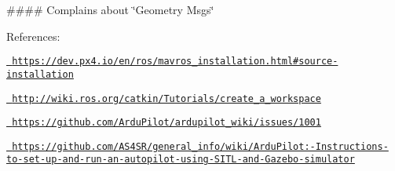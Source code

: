 \#\#\#\# Complains about \char`\"{}\+Geometry Msgs\char`\"{} 
\begin{DoxyCode}{0}
\end{DoxyCode}


\DoxyHorRuler


References\+:
\begin{DoxyItemize}
\item \href{https://dev.px4.io/en/ros/mavros_installation.html\#source-installation}{\texttt{ https\+://dev.\+px4.\+io/en/ros/mavros\+\_\+installation.\+html\#source-\/installation}}
\item \href{http://wiki.ros.org/catkin/Tutorials/create_a_workspace}{\texttt{ http\+://wiki.\+ros.\+org/catkin/\+Tutorials/create\+\_\+a\+\_\+workspace}}
\item \href{https://github.com/ArduPilot/ardupilot_wiki/issues/1001}{\texttt{ https\+://github.\+com/\+Ardu\+Pilot/ardupilot\+\_\+wiki/issues/1001}}
\item \href{https://github.com/AS4SR/general_info/wiki/ArduPilot:-Instructions-to-set-up-and-run-an-autopilot-using-SITL-and-Gazebo-simulator}{\texttt{ https\+://github.\+com/\+A\+S4\+S\+R/general\+\_\+info/wiki/\+Ardu\+Pilot\+:-\/\+Instructions-\/to-\/set-\/up-\/and-\/run-\/an-\/autopilot-\/using-\/\+S\+I\+T\+L-\/and-\/\+Gazebo-\/simulator}} 
\end{DoxyItemize}